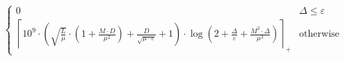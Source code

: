 \[\begin{cases} 0 & \Delta \leq \varepsilon \\ \left\lceil 10^{9} \cdot \left(\sqrt{\frac{L}{\mu}} \cdot \left(1 + \frac{M \cdot D}{\mu^{2}}\right) + \frac{D}{\sqrt{\mu \cdot \varepsilon}} + 1\right) \cdot \log\left(2 + \frac{\Delta}{\varepsilon} + \frac{M^{2} \cdot \Delta}{\mu^{3}}\right) \right\rceil_{+} & \mathrm{otherwise} \end{cases}\]
